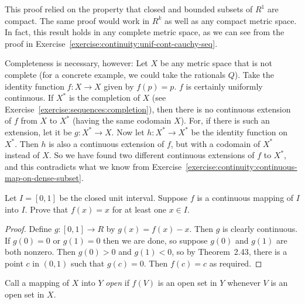 \begin{solution}
  This proof relied on the property that closed and bounded subsets of
  $R^1$ are compact. The same proof would work in $R^k$ as well as any
  compact metric space. In fact, this result holds in any complete
  metric space, as we can see from the proof in
  Exercise~\ref{exercise:continuity:unif-cont-cauchy-seq}.

  Completeness is necessary, however: Let $X$ be any metric space that
  is not complete (for a concrete example, we could take the rationals
  $Q$). Take the identity function $f\colon X\to X$ given by
  $f(p) = p$. $f$ is certainly uniformly continuous. If $X^*$ is the
  completion of $X$ (see
  Exercise~\ref{exercise:sequences:completion}), then there is no
  continuous extension of $f$ from $X$ to $X^*$ (having the same
  codomain $X$). For, if there is such an extension, let it be
  $g\colon X^*\to X$. Now let $h\colon X^*\to X^*$ be the identity
  function on $X^*$. Then $h$ is also a continuous extension of $f$,
  but with a codomain of $X^*$ instead of $X$. So we have found two
  different continuous extensions of $f$ to $X^*$, and this
  contradicts what we know from
  Exercise~\ref{exercise:continuity:continuous-map-on-dense-subset}.
\end{solution}

 Let $I = [0,1]$ be the closed unit interval. Suppose $f$
is a continuous mapping of $I$ into $I$. Prove that $f(x) = x$ for at
least one $x\in I$.
\begin{proof}
  Define $g\colon[0,1]\to R$ by $g(x) = f(x) - x$. Then $g$ is clearly
  continuous. If $g(0) = 0$ or $g(1) = 0$ then we are done, so suppose
  $g(0)$ and $g(1)$ are both nonzero. Then $g(0) > 0$ and $g(1) < 0$,
  so by Theorem~2.43, there is a point $c$ in $(0,1)$ such that
  $g(c) = 0$. Then $f(c) = c$ as required.
\end{proof}

 Call a mapping of $X$ into $Y$ {\em open} if $f(V)$ is
an open set in $Y$ whenever $V$ is an open set in $X$.


